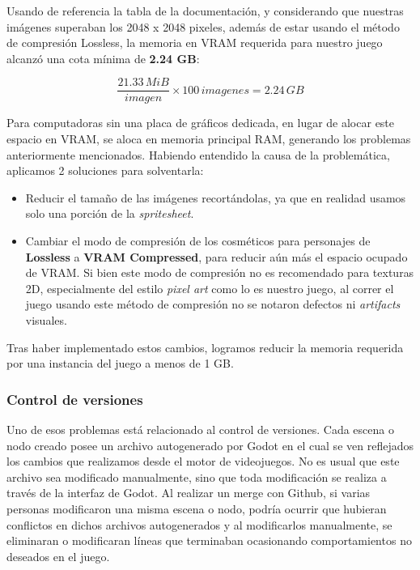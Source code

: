 Usando de referencia la tabla de la documentación, y considerando que nuestras imágenes superaban
los 2048 x 2048 pixeles, además de estar usando el método de compresión Lossless,
la memoria en VRAM requerida para nuestro juego alcanzó una cota mínima de \textbf{2.24 GB}:

\[
\frac{21.33 \, MiB}{imagen} \times 100 \, imagenes = 2.24 \, GB
\]

Para computadoras sin una placa de gráficos dedicada, en lugar de alocar este espacio en VRAM,
se aloca en memoria principal RAM, generando los problemas anteriormente mencionados.
Habiendo entendido la causa de la problemática, aplicamos 2 soluciones para solventarla:

\begin{itemize}
    \item Reducir el tamaño de las imágenes recortándolas, ya que en realidad usamos solo
    una porción de la \textit{spritesheet}.
    \item Cambiar el modo de compresión de los cosméticos para personajes de \textbf{Lossless}
    a \textbf{VRAM Compressed}, para reducir aún más el espacio ocupado de VRAM. Si bien este
    modo de compresión no es recomendado para texturas 2D, especialmente del estilo
    \textit{pixel art} como lo es nuestro juego, al correr el juego usando este método de compresión
    no se notaron defectos ni \textit{artifacts} visuales.
\end{itemize}

Tras haber implementado estos cambios, logramos reducir la memoria requerida por una instancia
del juego a menos de 1 GB.

\subsubsection{Control de versiones}

Uno de esos problemas está relacionado al control de versiones. Cada escena o nodo creado posee 
un archivo autogenerado por Godot en el cual se ven reflejados los cambios que realizamos desde 
el motor de videojuegos. No es usual que este archivo sea modificado manualmente, sino que toda 
modificación se realiza a través de la interfaz de Godot. Al realizar un merge con Github, si 
varias personas modificaron una misma escena o nodo, podría ocurrir que hubieran conflictos en 
dichos archivos autogenerados y al modificarlos manualmente, se eliminaran o modificaran líneas 
que terminaban ocasionando comportamientos no deseados en el juego.

